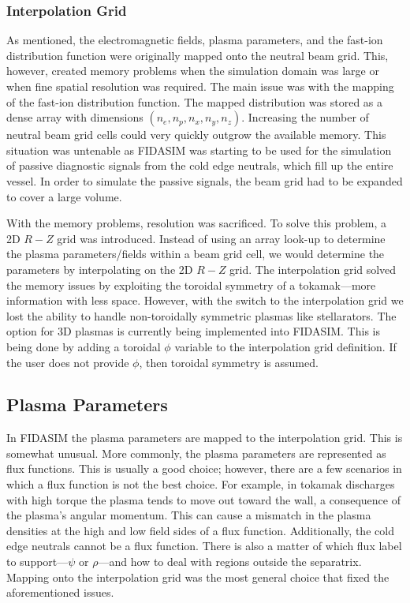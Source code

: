 \subsubsection{Interpolation Grid}
As mentioned, the electromagnetic fields, plasma parameters, and the fast-ion distribution function were originally mapped onto the neutral beam grid. This, however, created memory problems when the simulation domain was large or when fine spatial resolution was required. The main issue was with the mapping of the fast-ion distribution function. The mapped distribution was stored as a dense array with dimensions $(n_e,n_p,n_x,n_y,n_z)$. Increasing the number of neutral beam grid cells could very quickly outgrow the available memory. This situation was untenable as FIDASIM was starting to be used for the simulation of passive diagnostic signals from the cold edge neutrals, which fill up the entire vessel. In order to simulate the passive signals, the beam grid had to be expanded to cover a large volume. 

With the memory problems, resolution was sacrificed. To solve this problem, a 2D $R-Z$ grid was introduced. Instead of using an array look-up to determine the plasma parameters/fields within a beam grid cell, we would determine the parameters by interpolating on the 2D $R-Z$ grid. The interpolation grid solved the memory issues by exploiting the toroidal symmetry of a tokamak---more information with less space. However, with the switch to the interpolation grid we lost the ability to handle non-toroidally symmetric plasmas like stellarators. The option for 3D plasmas is currently being implemented into FIDASIM. This is being done by adding a toroidal $\phi$ variable to the interpolation grid definition. If the user does not provide $\phi$, then toroidal symmetry is assumed.

\subsection{Plasma Parameters}
In FIDASIM the plasma parameters are mapped to the interpolation grid. This is somewhat unusual. More commonly, the plasma parameters are represented as flux functions. This is usually a good choice; however, there are a few scenarios in which a flux function is not the best choice. For example, in tokamak discharges with high torque the plasma tends to move out toward the wall, a consequence of the plasma's angular momentum. This can cause a mismatch in the plasma densities at the high and low field sides of a flux function. Additionally, the cold edge neutrals cannot be a flux function. There is also a matter of which flux label to support---$\psi$ or $\rho$---and how to deal with regions outside the separatrix. Mapping onto the interpolation grid was the most general choice that fixed the aforementioned issues.

